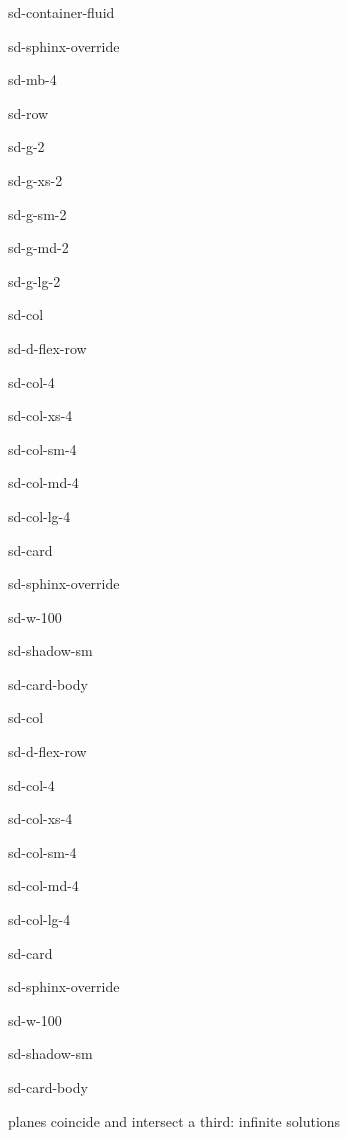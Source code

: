 \documentclass[letterpaper,10pt,english]{jupyterBook}
\begin{document}
\begin{sphinxuseclass}{sd-container-fluid}
\begin{sphinxuseclass}{sd-sphinx-override}
\begin{sphinxuseclass}{sd-mb-4}
\begin{sphinxuseclass}{sd-row}
\begin{sphinxuseclass}{sd-g-2}
\begin{sphinxuseclass}{sd-g-xs-2}
\begin{sphinxuseclass}{sd-g-sm-2}
\begin{sphinxuseclass}{sd-g-md-2}
\begin{sphinxuseclass}{sd-g-lg-2}
\begin{sphinxuseclass}{sd-col}
\begin{sphinxuseclass}{sd-d-flex-row}
\begin{sphinxuseclass}{sd-col-4}
\begin{sphinxuseclass}{sd-col-xs-4}
\begin{sphinxuseclass}{sd-col-sm-4}
\begin{sphinxuseclass}{sd-col-md-4}
\begin{sphinxuseclass}{sd-col-lg-4}
\begin{sphinxuseclass}{sd-card}
\begin{sphinxuseclass}{sd-sphinx-override}
\begin{sphinxuseclass}{sd-w-100}
\begin{sphinxuseclass}{sd-shadow-sm}
\begin{sphinxuseclass}{sd-card-body}
\end{sphinxuseclass}
\end{sphinxuseclass}
\end{sphinxuseclass}
\end{sphinxuseclass}
\end{sphinxuseclass}
\end{sphinxuseclass}
\end{sphinxuseclass}
\end{sphinxuseclass}
\end{sphinxuseclass}
\end{sphinxuseclass}
\end{sphinxuseclass}
\end{sphinxuseclass}
\begin{sphinxuseclass}{sd-col}
\begin{sphinxuseclass}{sd-d-flex-row}
\begin{sphinxuseclass}{sd-col-4}
\begin{sphinxuseclass}{sd-col-xs-4}
\begin{sphinxuseclass}{sd-col-sm-4}
\begin{sphinxuseclass}{sd-col-md-4}
\begin{sphinxuseclass}{sd-col-lg-4}
\begin{sphinxuseclass}{sd-card}
\begin{sphinxuseclass}{sd-sphinx-override}
\begin{sphinxuseclass}{sd-w-100}
\begin{sphinxuseclass}{sd-shadow-sm}
\begin{sphinxuseclass}{sd-card-body}
\begin{figure}[htbp]
\centering

\noindent{}
\end{figure}

 planes coincide and intersect a third: infinite solutions


\end{sphinxuseclass}
\end{sphinxuseclass}
\end{sphinxuseclass}
\end{sphinxuseclass}
\end{sphinxuseclass}
\end{sphinxuseclass}
\end{sphinxuseclass}
\end{sphinxuseclass}
\end{sphinxuseclass}
\end{sphinxuseclass}
\end{sphinxuseclass}
\end{sphinxuseclass}
\end{sphinxuseclass}
\end{sphinxuseclass}
\end{sphinxuseclass}
\end{sphinxuseclass}
\end{sphinxuseclass}
\end{sphinxuseclass}
\end{sphinxuseclass}
\end{sphinxuseclass}
\end{sphinxuseclass}
\end{document}
